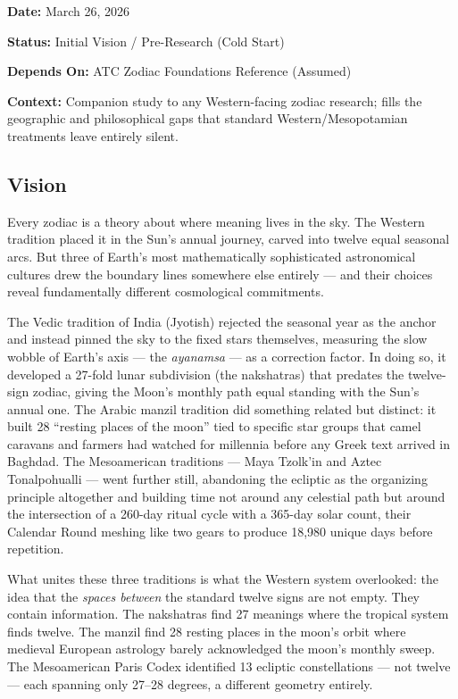 \documentclass[11pt,letterpaper]{article}
\newcommand{\metafield}[2]{\textbf{\sffamily #1} #2\par}
\begin{document}
\metafield{Date:}{March 26, 2026}
\metafield{Status:}{Initial Vision / Pre-Research (Cold Start)}
\metafield{Depends On:}{ATC Zodiac Foundations Reference (Assumed)}
\metafield{Context:}{Companion study to any Western-facing zodiac research; fills the geographic and philosophical gaps that standard Western/Mesopotamian treatments leave entirely silent.}

\subsection{Vision}

Every zodiac is a theory about where meaning lives in the sky. The Western tradition placed it in the Sun's annual journey, carved into twelve equal seasonal arcs. But three of Earth's most mathematically sophisticated astronomical cultures drew the boundary lines somewhere else entirely --- and their choices reveal fundamentally different cosmological commitments.

The Vedic tradition of India (Jyotish) rejected the seasonal year as the anchor and instead pinned the sky to the fixed stars themselves, measuring the slow wobble of Earth's axis --- the \textit{ayanamsa} --- as a correction factor. In doing so, it developed a 27-fold lunar subdivision (the nakshatras) that predates the twelve-sign zodiac, giving the Moon's monthly path equal standing with the Sun's annual one. The Arabic manzil tradition did something related but distinct: it built 28 ``resting places of the moon'' tied to specific star groups that camel caravans and farmers had watched for millennia before any Greek text arrived in Baghdad. The Mesoamerican traditions --- Maya Tzolk'in and Aztec Tonalpohualli --- went further still, abandoning the ecliptic as the organizing principle altogether and building time not around any celestial path but around the intersection of a 260-day ritual cycle with a 365-day solar count, their Calendar Round meshing like two gears to produce 18,980 unique days before repetition.

What unites these three traditions is what the Western system overlooked: the idea that the \textit{spaces between} the standard twelve signs are not empty. They contain information. The nakshatras find 27 meanings where the tropical system finds twelve. The manzil find 28 resting places in the moon's orbit where medieval European astrology barely acknowledged the moon's monthly sweep. The Mesoamerican Paris Codex identified 13 ecliptic constellations --- not twelve --- each spanning only 27--28 degrees, a different geometry entirely.
\end{document}
